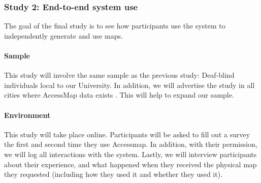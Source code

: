\subsubsection{Study 2: End-to-end system use}
\label{sec:field-web}
The goal of the final study is to see how participants use the system to independently generate and use maps. 

\paragraph{Sample}
This study will involve the same sample as the previous study: Deaf-blind individuals local to our University. In addition, we will advertise the study in all cities where AccessMap data exists . This will help to expand our sample. 

\paragraph{Environment}
This study will take place online. Participants will be asked to fill out a survey the first and second time they use Accessmap. In addition, with their permission, we will log all interactions with the system.  Lastly, we will interview participants about their experience, and what happened when they received the physical map they requested (including how they used it and whether they used it). 